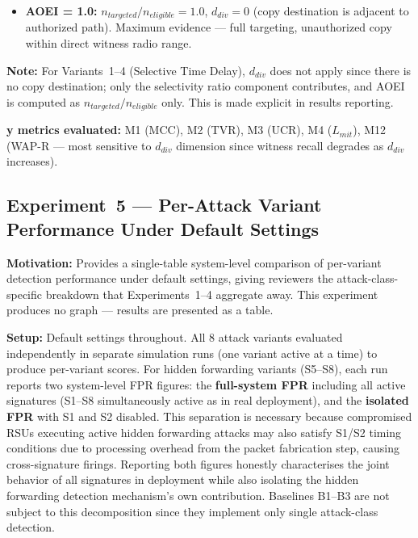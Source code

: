 \documentclass[12pt, a4paper]{report}
\begin{document}
{{\begin{itemize}
    \item \textbf{AOEI = 1.0:}
    $n_{targeted}/n_{eligible} = 1.0$,
    $d_{div} = 0$ (copy destination is adjacent
    to authorized path).
    Maximum evidence — full targeting, unauthorized
    copy within direct witness radio range.
\end{itemize}

\textbf{Note:} For Variants~1--4 (Selective Time
Delay), $d_{div}$ does not apply since there is
no copy destination; only the selectivity ratio
component contributes, and AOEI is computed as
$n_{targeted}/n_{eligible}$ only. This is made
explicit in results reporting.

\textbf{y metrics evaluated:}
M1 (MCC), M2 (TVR), M3 (UCR), M4 ($L_{mit}$),
M12 (WAP-R — most sensitive to $d_{div}$ dimension
since witness recall degrades as $d_{div}$ increases).



\subsection{Experiment~5 — Per-Attack Variant
Performance Under Default Settings}
\label{sec:exp5}

\textbf{Motivation:} Provides a single-table
system-level comparison of per-variant detection
performance under default settings, giving
reviewers the attack-class-specific breakdown
that Experiments~1--4 aggregate away. This
experiment produces no graph — results are
presented as a table.

\textbf{Setup:} Default settings throughout. All 8
attack variants evaluated independently in separate
simulation runs (one variant active at a time) to
produce per-variant scores. For hidden forwarding
variants (S5--S8), each run reports two system-level
\ac{FPR} figures: the \textbf{full-system \ac{FPR}}
including all active signatures (S1--S8 simultaneously
active as in real deployment), and the
\textbf{isolated \ac{FPR}} with S1 and S2 disabled.
This separation is necessary because compromised
\ac{RSU}s executing active hidden forwarding attacks
may also satisfy S1/S2 timing conditions due to
processing overhead from the packet fabrication step,
causing cross-signature firings. Reporting both
figures honestly characterises the joint behavior of
all signatures in deployment while also isolating the
hidden forwarding detection mechanism's own
contribution. Baselines B1--B3 are not subject to
this decomposition since they implement only single
attack-class detection.


}}
\end{document}
